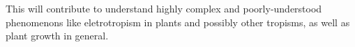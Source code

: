 This will contribute to understand highly complex and poorly-understood phenomenons like eletrotropism in plants and possibly other tropisms, as well as plant growth in general.

%



